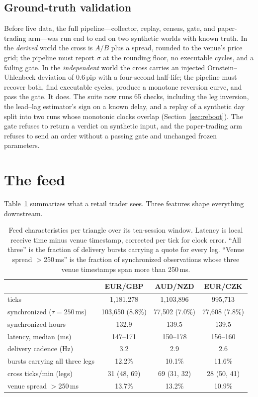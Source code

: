 \documentclass[11pt]{article}
\begin{document}
\subsection{Ground-truth validation}

Before live data, the full pipeline---collector, replay, census, gate,
and paper-trading arm---was run end to end on two synthetic worlds with
known truth. In the \emph{derived} world the cross is $A/B$ plus a
spread, rounded to the venue's price grid; the pipeline must report
$\sigma$ at the rounding floor, no executable cycles, and a failing
gate. In the \emph{independent} world the cross carries an injected
Ornstein--Uhlenbeck deviation of 0.6\,pip with a four-second half-life;
the pipeline must recover both, find executable cycles, produce a
monotone reversion curve, and pass the gate. It does. The suite now
runs 65 checks, including the leg inversion, the lead--lag estimator's
sign on a known delay, and a replay of a synthetic day split into two
runs whose monotonic clocks overlap (Section~\ref{sec:reboot}). The
gate refuses to return a verdict on synthetic input, and the
paper-trading arm refuses to send an order without a passing gate and
unchanged frozen parameters.

\section{The feed}\label{sec:feed}

Table~\ref{tab:feed} summarizes what a retail trader sees. Three
features shape everything downstream.

\begin{table}[t]
\centering
\caption{Feed characteristics per triangle over its ten-session window.
Latency is local receive time minus venue timestamp, corrected per tick
for clock error. ``All three'' is the fraction of delivery bursts
carrying a quote for every leg. ``Venue spread $>$250\,ms'' is the
fraction of synchronized observations whose three venue timestamps span
more than 250\,ms.}
\label{tab:feed}
\begin{tabular}{lccc}
\toprule
 & EUR/GBP & AUD/NZD & EUR/CZK \\
\midrule
ticks & 1{,}181{,}278 & 1{,}103{,}896 & 995{,}713 \\
synchronized ($\tau=250$\,ms) & 103{,}650 (8.8\%) & 77{,}502 (7.0\%) & 77{,}608 (7.8\%) \\
synchronized hours & 132.9 & 139.5 & 139.5 \\
latency, median (ms) & 147--171 & 150--178 & 156--160 \\
delivery cadence (Hz) & 3.2 & 2.9 & 2.6 \\
bursts carrying all three legs & 12.2\% & 10.1\% & 11.6\% \\
cross ticks/min (legs) & 31 (48, 69) & 69 (31, 32) & 28 (50, 41) \\
venue spread $>$250\,ms & 13.7\% & 13.2\% & 10.9\% \\
\bottomrule
\end{tabular}
\end{table}
\end{document}
